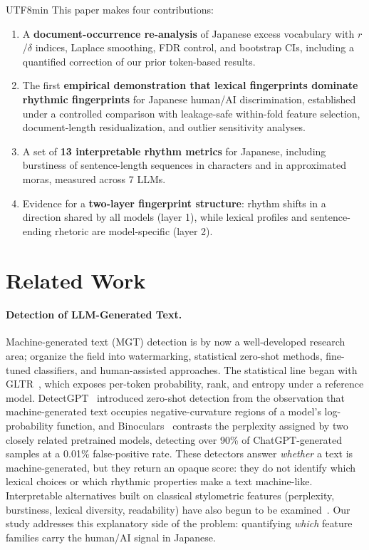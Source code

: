 \documentclass[11pt,a4paper]{article}
\begin{document}
\begin{CJK}{UTF8}{min}
This paper makes four contributions:
\begin{enumerate}
    \item A \textbf{document-occurrence re-analysis} of Japanese excess vocabulary with $r$/$\delta$ indices, Laplace smoothing, FDR control, and bootstrap CIs, including a quantified correction of our prior token-based results.
    \item The first \textbf{empirical demonstration that lexical fingerprints dominate rhythmic fingerprints} for Japanese human/AI discrimination, established under a controlled comparison with leakage-safe within-fold feature selection, document-length residualization, and outlier sensitivity analyses.
    \item A set of \textbf{13 interpretable rhythm metrics} for Japanese, including burstiness of sentence-length sequences in characters and in approximated moras, measured across 7 LLMs.
    \item Evidence for a \textbf{two-layer fingerprint structure}: rhythm shifts in a direction shared by all models (layer 1), while lexical profiles and sentence-ending rhetoric are model-specific (layer 2).
\end{enumerate}

\section{Related Work}

\paragraph{Detection of LLM-Generated Text.}
Machine-generated text (MGT) detection is by now a well-developed research area; \citet{wu2025survey} organize the field into watermarking, statistical zero-shot methods, fine-tuned classifiers, and human-assisted approaches. The statistical line began with GLTR~\citep{gehrmann2019gltr}, which exposes per-token probability, rank, and entropy under a reference model. DetectGPT~\citep{mitchell2023detectgpt} introduced zero-shot detection from the observation that machine-generated text occupies negative-curvature regions of a model's log-probability function, and Binoculars~\citep{hans2024binoculars} contrasts the perplexity assigned by two closely related pretrained models, detecting over 90\% of ChatGPT-generated samples at a 0.01\% false-positive rate. These detectors answer \emph{whether} a text is machine-generated, but they return an opaque score: they do not identify which lexical choices or which rhythmic properties make a text machine-like. Interpretable alternatives built on classical stylometric features (perplexity, burstiness, lexical diversity, readability) have also begun to be examined~\citep{tarim2025detection}. Our study addresses this explanatory side of the problem: quantifying \emph{which} feature families carry the human/AI signal in Japanese.


\end{CJK}
\end{document}

